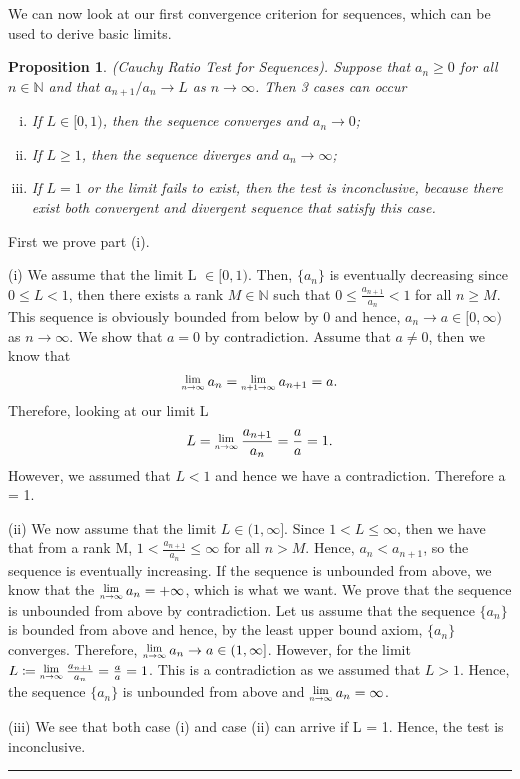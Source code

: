 \documentclass[twoside]{article}
\newcommand{\Lim}[1]{\raisebox{0.5ex}{\scalebox{0.8}{$\displaystyle \lim_{#1}\;$}}}
\newtheorem{proposition}[theorem]{Proposition}
\newenvironment{proof}{{\bf Proof:}}{\hfill\rule{2mm}{2mm}}
\begin{document}
\bigskip
We can now look at our first convergence criterion for sequences, which can be used to derive basic limits.

\begin{proposition}
(Cauchy Ratio Test for Sequences). Suppose that $a_n \geq 0$ for all $n \in \mathbb{N}$ and that $a_{n+1}/a_n \rightarrow L$ as $n \rightarrow \infty$. Then 3 cases can occur
\begin{enumerate}[(i)]
  \item If $L \in [0,1)$, then the sequence converges and $a_n \rightarrow 0$;
  \item If $L \geq 1$, then the sequence diverges and $a_n \rightarrow \infty$;
  \item If $L = 1$ or the limit fails to exist, then the test is inconclusive, because there exist both convergent and divergent sequence that satisfy this case.
\end{enumerate}
\end{proposition}

\begin{proof}
First we prove part (i).

(i)
We assume that the limit L $\in [0,1)$. Then, $\{a_n\}$ is eventually decreasing since $0 \leq L < 1$, then there exists a rank $M \in \mathbb{N}$ such that $0 \leq \frac{a_{n+1}}{a_n} < 1$ for all $n \geq M$. This sequence is obviously bounded from below by 0 and hence, $a_n \rightarrow a \in [0, \infty)$ as $n \rightarrow \infty$. We show that $a = 0$ by contradiction. Assume that $a \neq 0$, then we know that
$$
\Lim{n \rightarrow \infty}a_n = \Lim{n+1 \rightarrow \infty}a_{n+1} = a.
$$
Therefore, looking at our limit L
$$
L = \Lim{n \rightarrow \infty}\frac{a_{n+1}}{a_n} = \frac{a}{a} = 1.
$$
However, we assumed that $L < 1$ and hence we have a contradiction. Therefore a = 1.

(ii)
We now assume that the limit $L \in (1, \infty]$. Since $1 < L \leq \infty$, then we have that from a rank M, $1 < \frac{a_{n+1}}{a_n} \leq \infty$ for all $n > M$. Hence, $a_n < a_{n+1}$, so the sequence is eventually increasing. If the sequence is unbounded from above, we know that the $\Lim{n \rightarrow \infty}a_n = +\infty$, which is what we want. We prove that the sequence is unbounded from above by contradiction. Let us assume that the sequence $\{a_n\}$ is bounded from above and hence, by the least upper bound axiom, $\{a_n\}$ converges. Therefore, $\Lim{n \rightarrow \infty}a_n \rightarrow a \in (1, \infty]$. However, for the limit $L \coloneqq \Lim{n \rightarrow \infty}\frac{a_{n+1}}{a_n} = \frac{a}{a} = 1$. This is a contradiction as we assumed that $L > 1$. Hence, the sequence $\{a_n\}$ is unbounded from above and $\Lim{n \rightarrow \infty}a_n = \infty$.

(iii)
We see that both case (i) and case (ii) can arrive if L = 1. Hence, the test is inconclusive.
\end{proof}
\end{document}

